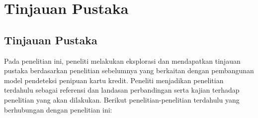 \newpage
\chapter{Tinjauan Pustaka} \label{Bab II}

\section{Tinjauan Pustaka} \label{II.Tinjauan}
Pada penelitian ini, peneliti melakukan eksplorasi dan mendapatkan tinjauan pustaka berdasarkan penelitian sebelumnya yang berkaitan dengan pembangunan model pendeteksi penipuan kartu kredit. Peneliti menjadikan penelitian terdahulu sebagai referensi dan landasan perbandingan serta kajian terhadap penelitian yang akan dilakukan. Berikut penelitian-penelitian terdahulu yang berhubungan dengan penelitian ini:

